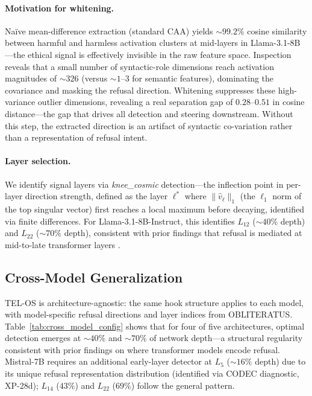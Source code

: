 \documentclass{article}
\begin{document}
\paragraph{Motivation for whitening.}
Na\"ive mean-difference extraction (standard CAA) yields ${\sim}99.2\%$ cosine
similarity between harmful and harmless activation clusters at mid-layers in
Llama-3.1-8B---the ethical signal is effectively invisible in the raw feature
space.
Inspection reveals that a small number of syntactic-role dimensions reach
activation magnitudes of ${\sim}326$ (versus ${\sim}1$--$3$ for semantic
features), dominating the covariance and masking the refusal direction.
Whitening suppresses these high-variance outlier dimensions, revealing a
real separation gap of $0.28$--$0.51$ in cosine distance---the gap that drives
all detection and steering downstream.
Without this step, the extracted direction is an artifact of syntactic
co-variation rather than a representation of refusal intent.

\paragraph{Layer selection.}
We identify signal layers via \textit{knee\_cosmic} detection---the inflection
point in per-layer direction strength, defined as the layer $\ell^*$ where
$\|\hat{v}_\ell\|_1$ (the $\ell_1$ norm of the top singular vector) first
reaches a local maximum before decaying, identified via finite differences.
For Llama-3.1-8B-Instruct, this identifies $L_{12}$ (${\sim}40\%$ depth) and
$L_{22}$ (${\sim}70\%$ depth), consistent with prior findings that refusal is
mediated at mid-to-late transformer layers \citep{arditi2024refusal}.

\subsection{Cross-Model Generalization}
\label{subsec:cross_model}

TEL-OS is architecture-agnostic: the same hook structure applies to each model,
with model-specific refusal directions and layer indices from \textsc{OBLITERATUS}.
Table~\ref{tab:cross_model_config} shows that for four of five architectures, optimal
detection emerges at ${\sim}40\%$ and ${\sim}70\%$ of network depth---a structural
regularity consistent with prior findings on where transformer models encode refusal.
Mistral-7B requires an additional early-layer detector at $L_5$ (${\sim}16\%$ depth)
due to its unique refusal representation distribution (identified via CODEC diagnostic,
XP-28d); $L_{14}$ ($43\%$) and $L_{22}$ ($69\%$) follow the general pattern.
\end{document}
